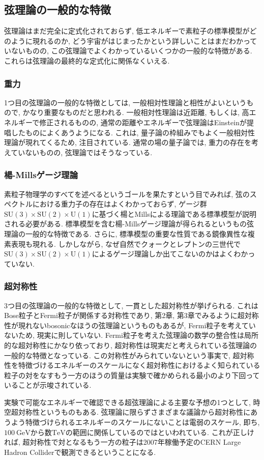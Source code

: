 \documentclass[10pt,a4paper]{jsarticle}
\begin{document}
\subsection{弦理論の一般的な特徴}
弦理論はまだ完全に定式化されておらず, 低エネルギーで素粒子の標準模型がどのように現れるのか, どう宇宙がはじまったかという詳しいことはまだわかっていないものの, この弦理論でよくわかっているいくつかの一般的な特徴がある. これらは弦理論の最終的な定式化に関係なくいえる. 
\subsubsection*{重力}
1つ目の弦理論の一般的な特徴としては, 一般相対性理論と相性がよいというもので, かなり重要なものだと思われる. 一般相対性理論は近距離, もしくは, 高エネルギーで修正されるものの, 通常の距離やエネルギーで弦理論はEinsteinが提唱したものによくあうようになる. これは, 量子論の枠組みでもよく一般相対性理論が現れてくるため, 注目されている. 通常の場の量子論では, 重力の存在を考えていないものの, 弦理論ではそうなっている. 
\subsubsection*{楊-Millsゲージ理論}
素粒子物理学のすべてを述べるというゴールを果たすという目でみれば, 弦のスペクトルにおける重力子の存在はよくわかっておらず, ゲージ群$\mathrm{SU} \left(3\right) \times \mathrm{SU} \left(2\right) \times \mathrm{U} \left(1\right) $に基づく楊とMillsによる理論である標準模型が説明される必要がある. 標準模型を含む楊-Millsゲージ理論が得られるというもの弦理論の一般的な特徴である. さらに, 標準模型の重要な性質である鏡像異性な複素表現も現れる. しかしながら, なぜ自然でクォークとレプトンの三世代で$\mathrm{SU} \left(3\right) \times \mathrm{SU} \left(2\right) \times \mathrm{U} \left(1\right) $によるゲージ理論しか出てこないのかはよくわかっていない. 
\subsubsection*{超対称性}
3つ目の弦理論の一般的な特徴として, 一貫とした超対称性が挙げられる. これはBose粒子とFermi粒子が関係する対称性であり, 第2章, 第3章でみるように超対称性が現れないbosonicなほうの弦理論というものもあるが, Fermi粒子を考えていないため, 現実に則していない. Fermi粒子を考えた弦理論の数学の整合性は局所的な超対称性にかなり依っており, 超対称性は現実だと考えられている弦理論の一般的な特徴となっている. この対称性がみられていないという事実で, 超対称性を特徴づけるエネルギーのスケールになく超対称性におけるよく知られている粒子の対をなすもう一方のほうの質量は実験で確かめられる最小のより下回っていることが示唆されている. \par
実験で可能なエネルギーで確認できる超弦理論による主要な予想の1つとして, 時空超対称性というものもある. 弦理論に限らずさまざまな議論から超対称性にあうよう特徴づけられるエネルギーのスケールにないことは電弱のスケール, 即ち, $100\ \mathrm{GeV}$から数$\mathrm{TeV}$の範囲に関係しているのではといわれている. これが正しければ, 超対称性で対となるもう一方の粒子は2007年稼働予定のCERN Large Hadron Colliderで観測できるということになる. 
\end{document}
